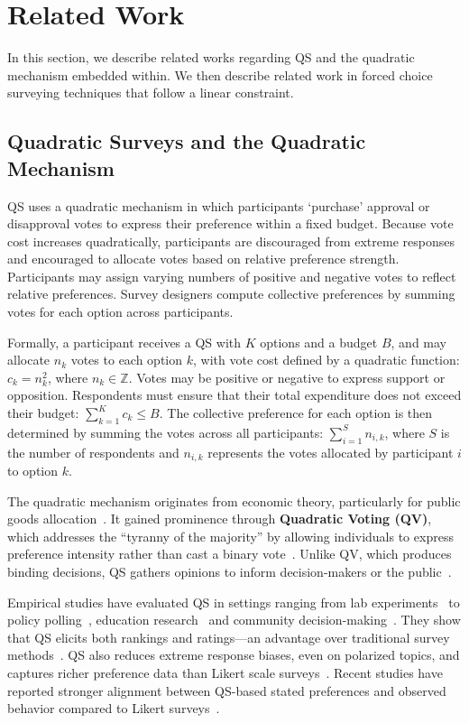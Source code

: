 \section{Related Work}
\label{sec:relatedWorks}
In this section, we describe related works regarding QS and the quadratic mechanism embedded within. We then describe related work in forced choice surveying techniques that follow a linear constraint.

\subsection{Quadratic Surveys and the Quadratic Mechanism}
QS uses a quadratic mechanism in which participants `purchase' approval or disapproval votes to express their preference within a fixed budget. Because vote cost increases quadratically, participants are discouraged from extreme responses and encouraged to allocate votes based on relative preference strength. Participants may assign varying numbers of positive and negative votes to reflect relative preferences. Survey designers compute collective preferences by summing votes for each option across participants.

Formally, a participant receives a QS with $K$ options and a budget $B$, and may allocate $n_k$ votes to each option $k$, with vote cost defined by a quadratic function: $c_k = n_k^2$, where $n_k \in \mathbb{Z}$. Votes may be positive or negative to express support or opposition. Respondents must ensure that their total expenditure does not exceed their budget: $\sum_{k=1}^{K} c_k \leq B$. The collective preference for each option is then determined by summing the votes across all participants: $\sum_{i=1}^{S} n_{i,k}$, where $S$ is the number of respondents and $n_{i,k}$ represents the votes allocated by participant $i$ to option $k$.

The quadratic mechanism originates from economic theory, particularly for public goods allocation~\cite{grovesOptimalAllocationPublic1977}. It gained prominence through \textbf{Quadratic Voting (QV)}, which addresses the ``tyranny of the majority'' by allowing individuals to express preference intensity rather than cast a binary vote~\cite{posner2018radical}. Unlike QV, which produces binding decisions, QS gathers opinions to inform decision-makers or the public~\cite{cavaille2024cares, chengOrganizeThenVote2025}.

Empirical studies have evaluated QS in settings ranging from lab experiments~\cite{chengCanShowWhat2021,quarfoot2017quadratic} to policy polling~\cite{cavaille2024cares, hollandDistributiveImpactsSupport2022}, education research~\cite{naylor2017first} and community decision-making~\cite{karpinskiPotentialQuadraticVoting2025}. They show that QS elicits both rankings and ratings---an advantage over traditional survey methods~\cite{chengCanShowWhat2021}. QS also reduces  extreme response biases, even on polarized topics, and captures richer preference data than Likert scale surveys~\cite{quarfoot2017quadratic, cavaille2024cares, chengCanShowWhat2021, naylor2017first}. Recent studies have reported stronger alignment between QS-based stated preferences and observed behavior compared to Likert surveys~\cite{cavaille2024cares, chengCanShowWhat2021}.

